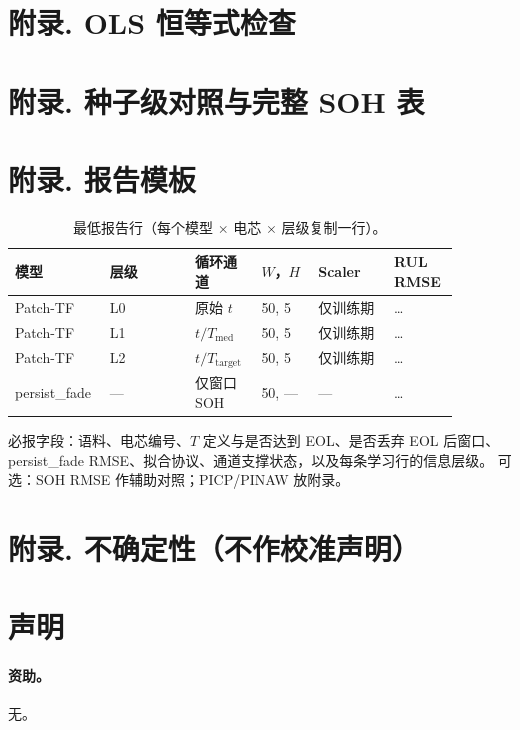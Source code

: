 \documentclass[UTF8,a4paper,12pt]{ctexart}
\begin{document}
\section*{附录. OLS 恒等式检查}


\section*{附录. 种子级对照与完整 SOH 表}


\section*{附录. 报告模板}

\begin{table}[htbp]
\centering
\caption{最低报告行（每个模型 $\times$ 电芯 $\times$ 层级复制一行）。}
\label{tab:template}
\begin{tabular}{@{}p{0.16\linewidth}p{0.18\linewidth}p{0.14\linewidth}p{0.12\linewidth}p{0.16\linewidth}p{0.12\linewidth}@{}}
\toprule
模型 & 层级 & 循环通道 & $W$，$H$ & Scaler & RUL RMSE \\
\midrule
Patch-TF & L0 & 原始 $t$ & 50, 5 & 仅训练期 & \ldots \\
Patch-TF & L1 & $t/T_{\mathrm{med}}$ & 50, 5 & 仅训练期 & \ldots \\
Patch-TF & L2 & $t/T_{\mathrm{target}}$ & 50, 5 & 仅训练期 & \ldots \\
persist\_fade & --- & 仅窗口 SOH & 50, --- & --- & \ldots \\
\bottomrule
\end{tabular}
\end{table}

必报字段：语料、电芯编号、$T$ 定义与是否达到 EOL、是否丢弃 EOL 后窗口、persist\_fade RMSE、拟合协议、通道支撑状态，以及每条学习行的信息层级。
可选：SOH RMSE 作辅助对照；PICP/PINAW 放附录。

\section*{附录. 不确定性（不作校准声明）}


\section*{声明}
\paragraph{资助。}无。
\end{document}

